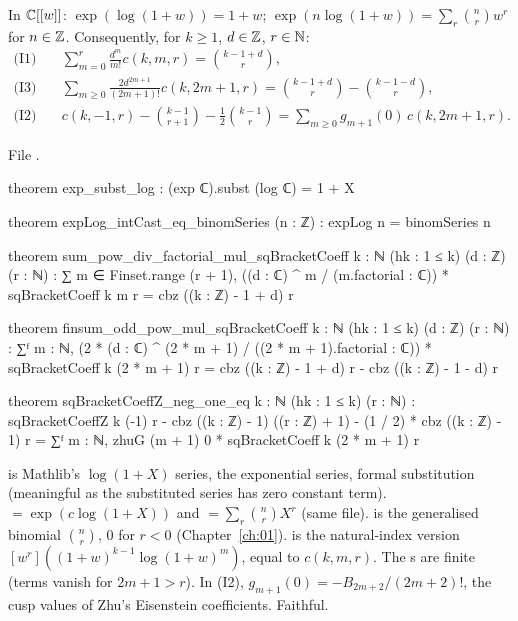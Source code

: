 \begin{theorem}\label{l14:thm:explog}
In ${\mathbb{C}}[[w]]$: $\exp(\log(1+w)) = 1+w$; $\exp(n\log(1+w)) = \sum_r\binom nrw^r$ for $n\in{\mathbb{Z}}$. Consequently, for $k\ge1$,
$d\in{\mathbb{Z}}$, $r\in{\mathbb{N}}$:
\begin{align*}
 \text{(I1)}\quad&\sum_{m=0}^{r}\frac{d^m}{m!}c(k,m,r) = \binom{k-1+d}{r},\\
 \text{(I3)}\quad&\sum_{m\ge0}\frac{2d^{2m+1}}{(2m+1)!}c(k,2m+1,r) = \binom{k-1+d}{r} - \binom{k-1-d}{r},\\
 \text{(I2)}\quad&c(k,-1,r) - \binom{k-1}{r+1} - \tfrac12\binom{k-1}{r} = \sum_{m\ge0}g_{m+1}(0)\,c(k,2m+1,r).
\end{align*}
\end{theorem}
\noindent File .
\begin{leancode}
theorem exp_subst_log : (exp ℂ).subst (log ℂ) = 1 + X

theorem expLog_intCast_eq_binomSeries (n : ℤ) : expLog n = binomSeries n

theorem sum_pow_div_factorial_mul_sqBracketCoeff {k : ℕ} (hk : 1 ≤ k) (d : ℤ) (r : ℕ) :
    ∑ m ∈ Finset.range (r + 1), ((d : ℂ) ^ m / (m.factorial : ℂ)) * sqBracketCoeff k m r
      = cbz ((k : ℤ) - 1 + d) r

theorem finsum_odd_pow_mul_sqBracketCoeff {k : ℕ} (hk : 1 ≤ k) (d : ℤ) (r : ℕ) :
    ∑ᶠ m : ℕ, (2 * (d : ℂ) ^ (2 * m + 1) / ((2 * m + 1).factorial : ℂ))
        * sqBracketCoeff k (2 * m + 1) r
      = cbz ((k : ℤ) - 1 + d) r - cbz ((k : ℤ) - 1 - d) r

theorem sqBracketCoeffZ_neg_one_eq {k : ℕ} (hk : 1 ≤ k) (r : ℕ) :
    sqBracketCoeffZ k (-1) r - cbz ((k : ℤ) - 1) ((r : ℤ) + 1) - (1 / 2) * cbz ((k : ℤ) - 1) r
      = ∑ᶠ m : ℕ, zhuG (m + 1) 0 * sqBracketCoeff k (2 * m + 1) r
\end{leancode}
\begin{dictionary}
 is Mathlib's $\log(1+X)$ series,  the exponential series,  formal substitution
(meaningful as the substituted series has zero constant term).  $=\exp(c\log(1+X))$ and 
$=\sum_r\binom nrX^r$ (same file).  is the generalised binomial $\binom nr$, $0$ for $r<0$ (Chapter~\ref{ch:01}).
 is the natural-index version $[w^r]((1+w)^{k-1}\log(1+w)^m)$, equal to $c(k,m,r)$. The
s are finite (terms vanish for $2m+1>r$). In (I2), $g_{m+1}(0) = -B_{2m+2}/(2m+2)!$, the cusp values of Zhu's
Eisenstein coefficients. Faithful.
\end{dictionary}
